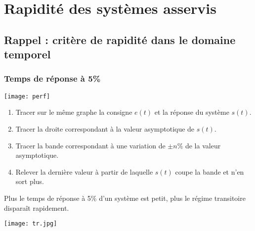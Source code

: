 \section{Rapidité des systèmes asservis}


\subsection{Rappel : critère de rapidité dans le domaine temporel}

\subsubsection{Temps de réponse à 5\%}

\begin{marginfigure}
\centering
\texttt{[image: perf]}
\end{marginfigure}

\begin{methode}%
\begin{enumerate}
\item Tracer sur le même graphe la consigne $e(t)$ et la réponse du système
$s(t)$.
\item Tracer la droite correspondant à la valeur asymptotique de $s(t)$.
\item Tracer la bande correspondant à une variation de $\pm n\%$ de la valeur
asymptotique.
\item Relever la dernière valeur à partir de laquelle $s(t)$ coupe la bande et
n'en sort plus.
\end{enumerate}
\end{methode}

\begin{resultat}
Plus le temps de réponse à 5\% d'un système est petit, plus le régime transitoire disparaît rapidement. 
\end{resultat}


\begin{marginfigure}
\centering
\texttt{[image: tr.jpg]}
\end{marginfigure}

